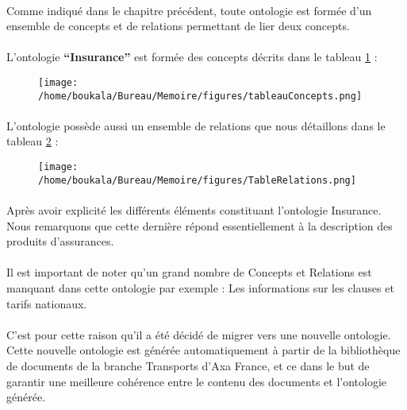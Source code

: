 \documentclass[12pt, a4paper, oneside]{book}
\begin{document}
\paragraph{}
Comme indiqué dans le chapitre précédent, toute ontologie est formée d'un ensemble de concepts et de relations permettant de lier deux concepts.
\paragraph{}
L'ontologie \textbf{“Insurance”} est formée des concepts décrits dans le tableau \ref{tableConcept} : 

\begin{figure}[h!]
\begin{center}
\texttt{[image: /home/boukala/Bureau/Memoire/figures/tableauConcepts.png]}
\label{tableConcept}
\end{center}
\end{figure}

\paragraph{}
L'ontologie possède aussi un ensemble de relations que nous détaillons dans le tableau \ref{tableRelation} : 

\begin{figure}[h!]
\begin{center}
\texttt{[image: /home/boukala/Bureau/Memoire/figures/TableRelations.png]}
\label{tableRelation}
\end{center}
\end{figure}


\paragraph{}
Après avoir explicité les différents éléments constituant l'ontologie Insurance. 
Nous remarquons que cette dernière répond essentiellement à la description des produits d'assurances. 
\paragraph{}
Il est important de noter qu'un grand nombre de Concepts et Relations est manquant dans cette ontologie par exemple : Les informations sur les clauses et tarifs nationaux.
\paragraph{}
C'est pour cette raison qu'il a été décidé de migrer vers une nouvelle ontologie.\\
Cette nouvelle ontologie est générée automatiquement à partir de la bibliothèque de documents de la branche Transports d'Axa France, et ce dans le but de garantir une meilleure cohérence entre le contenu des documents et l'ontologie générée.
\end{document}
